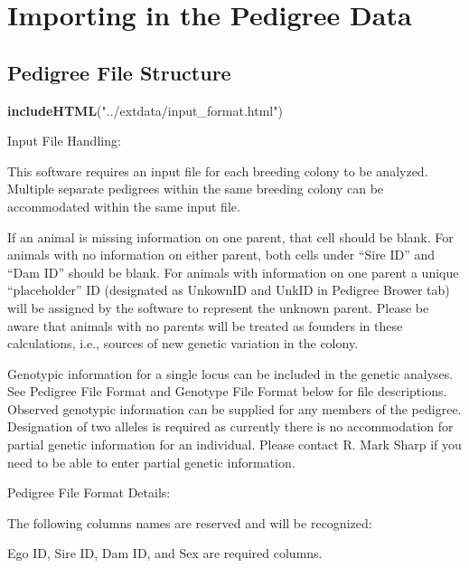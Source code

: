 \documentclass[]{article}
\newenvironment{Shaded}{\begin{snugshade}}{\end{snugshade}}
\newcommand{\KeywordTok}[1]{\textcolor[rgb]{0.13,0.29,0.53}{\textbf{#1}}}
\newcommand{\NormalTok}[1]{#1}
\newcommand{\StringTok}[1]{\textcolor[rgb]{0.31,0.60,0.02}{#1}}
\begin{document}
\hypertarget{importing-in-the-pedigree-data}{%
\section{Importing in the Pedigree
Data}\label{importing-in-the-pedigree-data}}

\hypertarget{pedigree-file-structure}{%
\subsection{Pedigree File Structure}\label{pedigree-file-structure}}

\begin{Shaded}
\begin{Highlighting}[]
\KeywordTok{includeHTML}\NormalTok{(}\StringTok{"../extdata/input_format.html"}\NormalTok{)}
\end{Highlighting}
\end{Shaded}

Input File Handling:

This software requires an input file for each breeding colony to be
analyzed. Multiple separate pedigrees within the same breeding colony
can be accommodated within the same input file.

If an animal is missing information on one parent, that cell should be
blank. For animals with no information on either parent, both cells
under ``Sire ID'' and ``Dam ID'' should be blank. For animals with
information on one parent a unique ``placeholder'' ID (designated as
UnkownID and UnkID in Pedigree Brower tab) will be assigned by the
software to represent the unknown parent. Please be aware that animals
with no parents will be treated as founders in these calculations, i.e.,
sources of new genetic variation in the colony.

Genotypic information for a single locus can be included in the genetic
analyses. See Pedigree File Format and Genotype File Format below for
file descriptions. Observed genotypic information can be supplied for
any members of the pedigree. Designation of two alleles is required as
currently there is no accommodation for partial genetic information for
an individual. Please contact R. Mark Sharp if you need to be able to
enter partial genetic information.

Pedigree File Format Details:

The following columns names are reserved and will be recognized:

Ego ID, Sire ID, Dam ID, and Sex are required columns.
\end{document}
